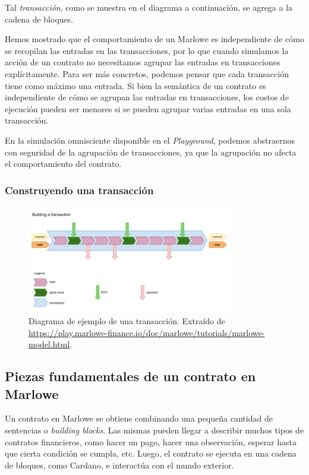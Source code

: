 \documentclass[12pt]{book}
\begin{document}
Tal \textit{transacción}, como se muestra en el diagrama a continuación, se agrega a la cadena de bloques. 

Hemos mostrado que el comportamiento de un Marlowe es independiente de cómo se recopilan las entradas en las transacciones, por lo que cuando simulamos la acción de un contrato no necesitamos agrupar las entradas en transacciones explícitamente. Para ser más concretos, podemos pensar que cada transacción tiene como máximo una entrada. Si bien la semántica de un contrato es independiente de cómo se agrupan las entradas en transacciones, los costos de ejecución pueden ser menores si se pueden agrupar varias entradas en una sola transacción.

En la simulación omnisciente disponible en el \textit{Playground}, podemos abstraernos con seguridad de la agrupación de transacciones, ya que la agrupación no afecta el comportamiento del contrato.

\subsubsection{Construyendo una transacción}

\begin{figure}[H]
    \centering
    \includegraphics[width=0.8\textwidth]{Transaccion.png}
    \caption{Diagrama de ejemplo de una transacción. Extraído de \url{https://play.marlowe-finance.io/doc/marlowe/tutorials/marlowe-model.html}.}\label{fig:Transaccion}
\end{figure}


\subsection{Piezas fundamentales de un contrato en Marlowe}\label{ssec:constructores_marlowe}
Un contrato en Marlowe se obtiene combinando una pequeña cantidad de sentencias o \textit{building blocks}. Las mismas pueden llegar a describir muchos tipos de contratos financieros, como hacer un pago, hacer una observación, esperar hasta que cierta condición se cumpla, etc. Luego, el contrato se ejecuta en una cadena de bloques, como Cardano, e interactúa con el mundo exterior.
\end{document}
